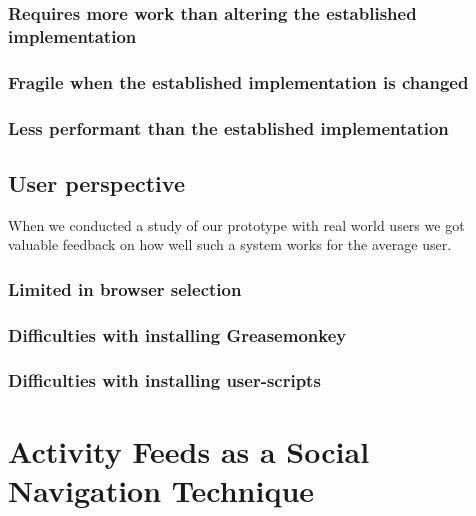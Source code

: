 \subsubsection{Requires more work than altering the established
  implementation}

\subsubsection{Fragile when the established implementation is changed}

\subsubsection{Less performant than the established implementation}

\subsection{User perspective}

When we conducted a study of our prototype with real world users
we got valuable feedback on how well such a system works for the average user.

\subsubsection{Limited in browser selection}

\subsubsection{Difficulties with installing Greasemonkey}

\subsubsection{Difficulties with installing user-scripts}


\section{Activity Feeds as a Social Navigation Technique}
